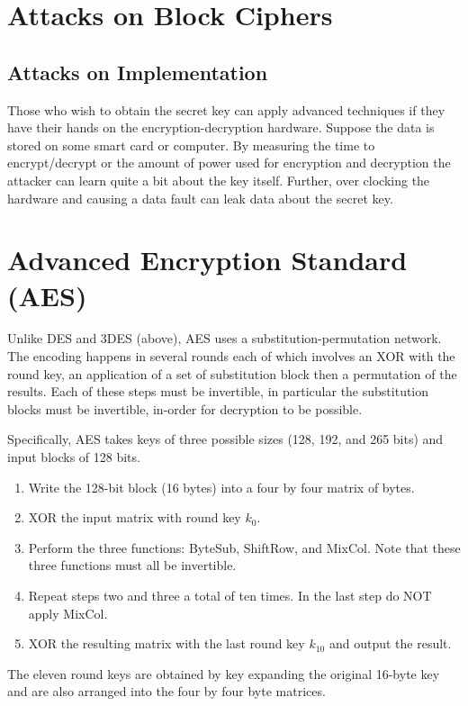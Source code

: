 \documentclass[twoside]{article}
\begin{document}
\section{Attacks on Block Ciphers}
\subsection{Attacks on Implementation}
Those who wish to obtain the secret key can apply advanced techniques if they have their hands on the encryption-decryption hardware. Suppose the data is stored on some smart card or computer. By measuring the time to encrypt/decrypt or the amount of power used for encryption and decryption the attacker can learn quite a bit about the key itself. Further, over clocking the hardware and causing a data fault can leak data about the secret key.

\section{Advanced Encryption Standard (AES)}
Unlike DES and 3DES (above), AES uses a substitution-permutation network. The encoding happens in several rounds each of which involves an XOR with the round key, an application of a set of substitution block then a permutation of the results. Each of these steps must be invertible, in particular the substitution blocks must be invertible, in-order for decryption to be possible.

Specifically, AES takes keys of three possible sizes (128, 192, and 265 bits) and input blocks of 128 bits.
\begin{enumerate}
\item Write the 128-bit block (16 bytes) into a four by four matrix of bytes.
\item XOR the input matrix with round key $k_0$. 
\item Perform the three functions: ByteSub, ShiftRow, and MixCol. Note that these three functions must all be invertible. 
\item Repeat steps two and three a total of ten times. In the last step do NOT apply MixCol.
\item XOR the resulting matrix with the last round key $k_{10}$ and output the result.
\end{enumerate}

The eleven round keys are obtained by key expanding the original 16-byte key and are also arranged into the four by four byte matrices.
\end{document}
